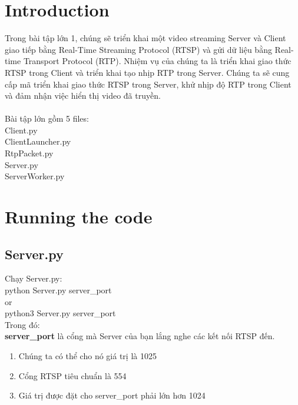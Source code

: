 \documentclass[a4paper]{article}
\begin{document}
\newpage
\tableofcontents
\newpage


\section{Introduction}

\indent Trong bài tập lớn 1, chúng sẽ triển khai một video streaming Server và Client giao tiếp bằng Real-Time Streaming Protocol (RTSP) và gửi dữ liệu bằng Real-time Transport Protocol (RTP). Nhiệm vụ của chúng ta là triển khai giao thức RTSP trong Client và triển khai tạo nhịp RTP trong Server. Chúng ta sẽ cung cấp mã triển khai giao thức RTSP trong Server, khử nhịp độ RTP trong Client và đảm nhận việc hiển thị video đã truyền.\\
\\
Bài tập lớn gồm 5 files: \\
\indent Client.py \\
\indent ClientLauncher.py \\
\indent RtpPacket.py \\
\indent Server.py \\
\indent ServerWorker.py 

\section{Running the code}

\subsection{Server.py}

Chạy Server.py: \\
\indent python Server.py server\_port \\
\indent or \\
\indent python3 Server.py server\_port \\

\noindent Trong đó: \\
\indent \textbf{server\_port} là cổng mà Server của bạn lắng nghe các kết nối RTSP đến.
\begin{enumerate}
    \item Chúng ta có thể cho nó giá trị là 1025
    \item Cổng RTSP tiêu chuẩn là 554
    \item Giá trị được đặt cho server\_port phải lớn hơn 1024
\end{enumerate}
\end{document}
